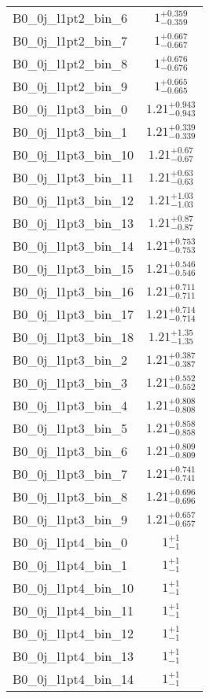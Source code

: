 \begin{tabular}{|l|c|}
B0\_0j\_l1pt2\_bin\_6 & $1^{+0.359}_{-0.359}$ \\
B0\_0j\_l1pt2\_bin\_7 & $1^{+0.667}_{-0.667}$ \\
B0\_0j\_l1pt2\_bin\_8 & $1^{+0.676}_{-0.676}$ \\
B0\_0j\_l1pt2\_bin\_9 & $1^{+0.665}_{-0.665}$ \\
B0\_0j\_l1pt3\_bin\_0 & $1.21^{+0.943}_{-0.943}$ \\
B0\_0j\_l1pt3\_bin\_1 & $1.21^{+0.339}_{-0.339}$ \\
B0\_0j\_l1pt3\_bin\_10 & $1.21^{+0.67}_{-0.67}$ \\
B0\_0j\_l1pt3\_bin\_11 & $1.21^{+0.63}_{-0.63}$ \\
B0\_0j\_l1pt3\_bin\_12 & $1.21^{+1.03}_{-1.03}$ \\
B0\_0j\_l1pt3\_bin\_13 & $1.21^{+0.87}_{-0.87}$ \\
B0\_0j\_l1pt3\_bin\_14 & $1.21^{+0.753}_{-0.753}$ \\
B0\_0j\_l1pt3\_bin\_15 & $1.21^{+0.546}_{-0.546}$ \\
B0\_0j\_l1pt3\_bin\_16 & $1.21^{+0.711}_{-0.711}$ \\
B0\_0j\_l1pt3\_bin\_17 & $1.21^{+0.714}_{-0.714}$ \\
B0\_0j\_l1pt3\_bin\_18 & $1.21^{+1.35}_{-1.35}$ \\
B0\_0j\_l1pt3\_bin\_2 & $1.21^{+0.387}_{-0.387}$ \\
B0\_0j\_l1pt3\_bin\_3 & $1.21^{+0.552}_{-0.552}$ \\
B0\_0j\_l1pt3\_bin\_4 & $1.21^{+0.808}_{-0.808}$ \\
B0\_0j\_l1pt3\_bin\_5 & $1.21^{+0.858}_{-0.858}$ \\
B0\_0j\_l1pt3\_bin\_6 & $1.21^{+0.809}_{-0.809}$ \\
B0\_0j\_l1pt3\_bin\_7 & $1.21^{+0.741}_{-0.741}$ \\
B0\_0j\_l1pt3\_bin\_8 & $1.21^{+0.696}_{-0.696}$ \\
B0\_0j\_l1pt3\_bin\_9 & $1.21^{+0.657}_{-0.657}$ \\
B0\_0j\_l1pt4\_bin\_0 & $1^{+1}_{-1}$ \\
B0\_0j\_l1pt4\_bin\_1 & $1^{+1}_{-1}$ \\
B0\_0j\_l1pt4\_bin\_10 & $1^{+1}_{-1}$ \\
B0\_0j\_l1pt4\_bin\_11 & $1^{+1}_{-1}$ \\
B0\_0j\_l1pt4\_bin\_12 & $1^{+1}_{-1}$ \\
B0\_0j\_l1pt4\_bin\_13 & $1^{+1}_{-1}$ \\
B0\_0j\_l1pt4\_bin\_14 & $1^{+1}_{-1}$ \\

\end{tabular}
